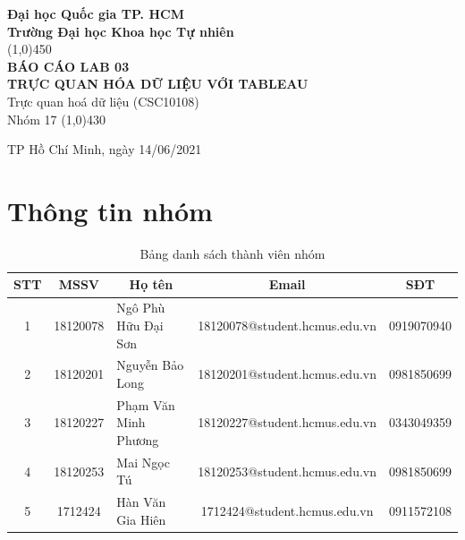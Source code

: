 \documentclass[a4paper, 12pt]{article}
\begin{document}
\begin{titlepage}
    \begin{center}
        \vspace*{1cm}
        \Large\textbf{Đại học Quốc gia TP. HCM\\Trường Đại học Khoa học Tự nhiên}\\

        \vfill
        \line(1,0){450}\\[4mm]
        \LARGE\textbf{\MakeUppercase{Báo cáo Lab 03\\ Trực quan hóa dữ liệu với Tableau}}\\[3mm]
        \Large{Trực quan hoá dữ liệu (CSC10108)}\\[3mm]
        \Large{Nhóm 17}
        \line(1,0){430}\\
        \vfill

        \vfill
        TP Hồ Chí Minh, ngày 14/06/2021
    \end{center}
\end{titlepage}

\tableofcontents
\thispagestyle{empty}
\clearpage

\section{Thông tin nhóm}
    \begin{table}[H]
        \begin{tabular}{|c|c|l|c|c|}
        \hline
        STT & MSSV     & \multicolumn{1}{c|}{Họ tên} & Email                         & SĐT        \\ \hline
        1   & 18120078 & Ngô Phù Hữu Đại Sơn         & 18120078@student.hcmus.edu.vn & 0919070940 \\ \hline
        2   & 18120201 & Nguyễn Bảo Long             & 18120201@student.hcmus.edu.vn & 0981850699 \\ \hline
        3   & 18120227 & Phạm Văn Minh Phương             & 18120227@student.hcmus.edu.vn & 0343049359 \\ \hline
        4   & 18120253 & Mai Ngọc Tú             & 18120253@student.hcmus.edu.vn & 0981850699 \\ \hline
        5   & 1712424 & Hàn Văn Gia Hiên            & 1712424@student.hcmus.edu.vn & 0911572108 \\ \hline
        \end{tabular}
        \caption{Bảng danh sách thành viên nhóm}
    \end{table}
    \clearpage
\end{document}
